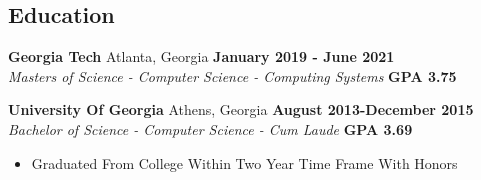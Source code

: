 \documentclass[margin,line]{resume}
\begin{document}
\begin{resume}
	\section{\mysidestyle Education}
	
	\textbf{Georgia Tech} Atlanta, Georgia \hfill \textbf{January 2019 - June 2021}\\
	\textsl{Masters of Science - Computer Science - Computing Systems} \hfill \textbf{GPA 3.75} \vspace{2mm}
	
	\textbf{University Of Georgia} Athens, Georgia \hfill \textbf{August 2013-December 2015} \\
	\textsl{Bachelor of Science - Computer Science - Cum Laude} \hfill \textbf{GPA 3.69}\vspace{2mm}
	\begin{itemize}
		\item Graduated From College Within Two Year Time Frame With Honors
	\end{itemize}
	
\end{resume}
\end{document}
